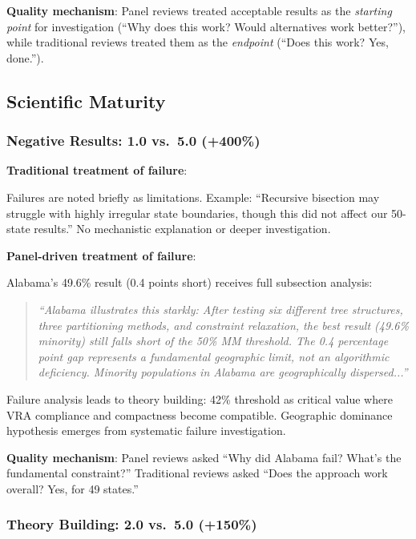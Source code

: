 \textbf{Quality mechanism}: Panel reviews treated acceptable results as the \emph{starting point} for investigation (``Why does this work? Would alternatives work better?''), while traditional reviews treated them as the \emph{endpoint} (``Does this work? Yes, done.'').

\subsection{Scientific Maturity}

\subsubsection{Negative Results: 1.0 vs.\ 5.0 (+400\%)}

\textbf{Traditional treatment of failure}:

Failures are noted briefly as limitations. Example: ``Recursive bisection may struggle with highly irregular state boundaries, though this did not affect our 50-state results.'' No mechanistic explanation or deeper investigation.

\textbf{Panel-driven treatment of failure}:

Alabama's 49.6\% result (0.4 points short) receives full subsection analysis:

\begin{quote}
\textit{``Alabama illustrates this starkly: After testing six different tree structures, three partitioning methods, and constraint relaxation, the best result (49.6\% minority) still falls short of the 50\% MM threshold. The 0.4 percentage point gap represents a fundamental geographic limit, not an algorithmic deficiency. Minority populations in Alabama are geographically dispersed...''}
\end{quote}

Failure analysis leads to theory building: 42\% threshold as critical value where VRA compliance and compactness become compatible. Geographic dominance hypothesis emerges from systematic failure investigation.

\textbf{Quality mechanism}: Panel reviews asked ``Why did Alabama fail? What's the fundamental constraint?'' Traditional reviews asked ``Does the approach work overall? Yes, for 49 states.''

\subsubsection{Theory Building: 2.0 vs.\ 5.0 (+150\%)}

